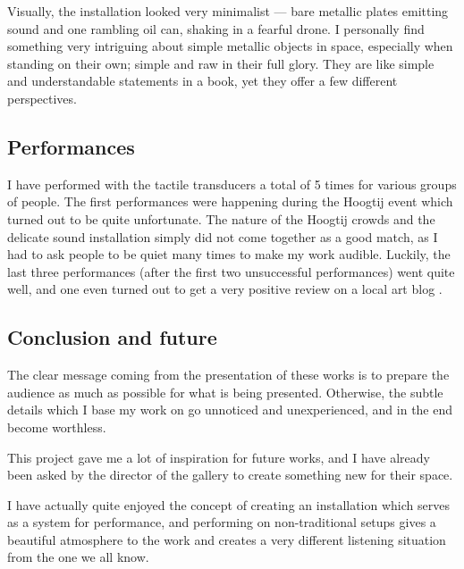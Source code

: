 \documentclass[12pt,a4paper,oneside]{report}
\begin{document}
Visually, the installation looked very minimalist --- bare metallic plates emitting sound and one rambling oil can, shaking in a fearful drone. I personally find something very intriguing about simple metallic objects in space, especially when standing on their own; simple and raw in their full glory. They are like simple and understandable statements in a book, yet they offer a few different perspectives.

\subsection{Performances}

I have performed with the tactile transducers a total of 5 times for various groups of people. The first performances were happening during the Hoogtij event which turned out to be quite unfortunate. The nature of the Hoogtij crowds and the delicate sound installation simply did not come together as a good match, as I had to ask people to be quiet many times to make my work audible. Luckily, the last three performances (after the first two unsuccessful performances) went quite well, and one even turned out to get a very positive review on a local art blog \cite{jegen}.

\subsection{Conclusion and future}

The clear message coming from the presentation of these works is to prepare the audience as much as possible for what is being presented. Otherwise, the subtle details which I base my work on go unnoticed and unexperienced, and in the end become worthless.

This project gave me a lot of inspiration for future works, and I have already been asked by the director of the gallery to create something new for their space.

I have actually quite enjoyed the concept of creating an installation which serves as a system for performance, and performing on non-traditional setups gives a beautiful atmosphere to the work and creates a very different listening situation from the one we all know. 
\end{document}
